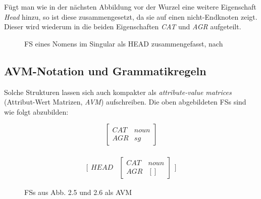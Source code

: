 \documentclass[12pt]{report}
\begin{document}
Fügt man wie in der nächsten Abbildung vor der Wurzel eine weitere Eigenschaft \textit{\glqq  Head\grqq{}} hinzu, so ist diese zusammengesetzt, da sie auf einen nicht-Endknoten zeigt. Dieser wird wiederum in die beiden Eigenschaften \textit{\glqq  CAT\grqq{}} und \textit{\glqq  AGR\grqq{}} aufgeteilt. 

\begin{figure}[h!]
\begin{center}
\caption{FS eines Nomens im Singular als HEAD zusammengefasst, nach \cite{cop04}}
\end{center}
\end{figure}

\subsection{AVM-Notation und Grammatikregeln}
Solche Strukturen lassen sich auch kompakter als \textit{attribute-value matrices} (Attribut-Wert Matrizen, \textit{AVM}) aufschreiben. Die oben abgebildeten FSs sind wie folgt abzubilden:
\\
\begin{figure}[h!]
\begin{displaymath}
\begin{bmatrix} 
CAT & noun \\
AGR & sg 
\end{bmatrix} 
\end{displaymath}
\\
\begin{displaymath}
\bigg[
\begin{matrix}
HEAD &
\begin{bmatrix} 
CAT & noun \\
AGR & [] 
\end{bmatrix} 
\end{matrix}
\bigg]
\end{displaymath}
\caption{FSs aus Abb. 2.5 und 2.6 als AVM \cite{cop04}}
\end{figure}
\\
\end{document}

